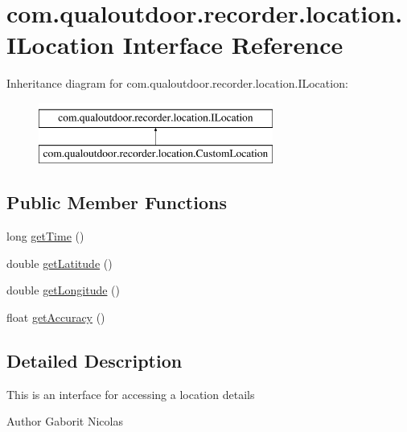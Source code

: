 \hypertarget{interfacecom_1_1qualoutdoor_1_1recorder_1_1location_1_1ILocation}{\section{com.\-qualoutdoor.\-recorder.\-location.\-I\-Location Interface Reference}
\label{interfacecom_1_1qualoutdoor_1_1recorder_1_1location_1_1ILocation}
}
Inheritance diagram for com.\-qualoutdoor.\-recorder.\-location.\-I\-Location\-:\begin{figure}[H]
\begin{center}
\leavevmode
\includegraphics[height=2.000000cm]{interfacecom_1_1qualoutdoor_1_1recorder_1_1location_1_1ILocation}
\end{center}
\end{figure}
\subsection*{Public Member Functions}
\begin{DoxyCompactItemize}
\item 
long \hyperlink{interfacecom_1_1qualoutdoor_1_1recorder_1_1location_1_1ILocation_aa398571da4c87344e1510f11e735be7d}{get\-Time} ()
\item 
double \hyperlink{interfacecom_1_1qualoutdoor_1_1recorder_1_1location_1_1ILocation_ac434141761fb171e19d60744c9e72221}{get\-Latitude} ()
\item 
double \hyperlink{interfacecom_1_1qualoutdoor_1_1recorder_1_1location_1_1ILocation_a429c80f707714fa60c46d6100df15e3c}{get\-Longitude} ()
\item 
float \hyperlink{interfacecom_1_1qualoutdoor_1_1recorder_1_1location_1_1ILocation_a075e49b863c907a050850671fa9ede6a}{get\-Accuracy} ()
\end{DoxyCompactItemize}


\subsection{Detailed Description}
This is an interface for accessing a location details

\begin{DoxyAuthor}{Author}
Gaborit Nicolas 
\end{DoxyAuthor}


